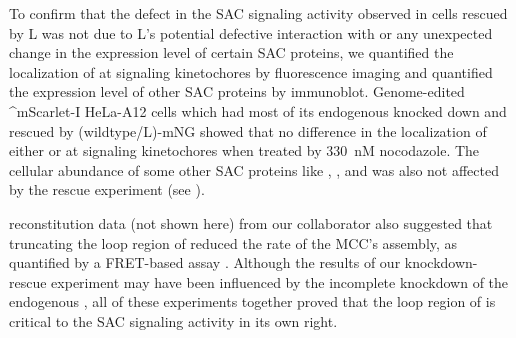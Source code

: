 To confirm that the defect in the SAC signaling activity observed in cells rescued by \textDelta{}L was not due to \textDelta{}L's potential defective interaction with  or any unexpected change in the expression level of certain SAC proteins, we quantified the localization of  at signaling kinetochores by fluorescence imaging and quantified the expression level of other SAC proteins by immunoblot. Genome-edited ^mScarlet-I HeLa-A12 cells which had most of its endogenous  knocked down and rescued by (wildtype/\textDelta{}L)-mNG showed that no difference in the localization of either  or  at signaling kinetochores when treated by \SI{330}{nM} nocodazole. The cellular abundance of some other SAC proteins like , , and  was also not affected by the rescue experiment (see ).

 reconstitution data (not shown here) from our collaborator also suggested that truncating the loop region of  reduced the rate of the MCC's assembly, as quantified by a FRET-based assay \cite{Faesen2017, BUB1-CDC20-MAD1}. Although the results of our knockdown-rescue experiment may have been influenced by the incomplete knockdown of the endogenous , all of these experiments together proved that the loop region of  is critical to the SAC signaling activity in its own right.